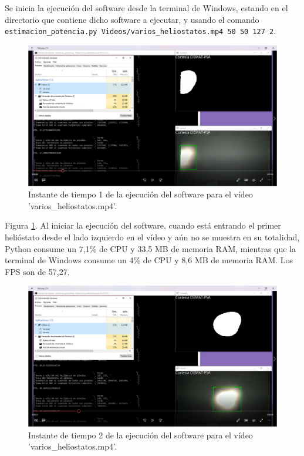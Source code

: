 Se inicia la ejecución del software desde la terminal de Windows, estando en el directorio que contiene dicho software a ejecutar, y usando el comando\\ \verb|estimacion_potencia.py Videos/varios_heliostatos.mp4 50 50 127 2|.

\begin{figure}[h!]
  	\centering
	\includegraphics[width=\textwidth]{CapturasRendimientoSoftware1/Imagen1.png}
	\caption{Instante de tiempo 1 de la ejecución del software para el vídeo 'varios\_heliostatos.mp4'.
	\label{fig:CapturasRendimientoSoftware1/Imagen1.png}}
\end{figure}

Figura \ref{fig:CapturasRendimientoSoftware1/Imagen1.png}. Al iniciar la ejecución del software, cuando está entrando el primer helióstato desde el lado izquierdo en el vídeo y aún no se muestra en su totalidad, Python consume un 7,1\% de CPU y 33,5 MB de memoria RAM, mientras que la terminal de Windows consume un 4\% de CPU y 8,6 MB de memoria RAM. Los FPS son de 57,27.

\begin{figure}[h!]
  	\centering
	\includegraphics[width=\textwidth]{CapturasRendimientoSoftware1/Imagen2.png}
	\caption{Instante de tiempo 2 de la ejecución del software para el vídeo 'varios\_heliostatos.mp4'.
	\label{fig:CapturasRendimientoSoftware1/Imagen2.png}}
\end{figure}

